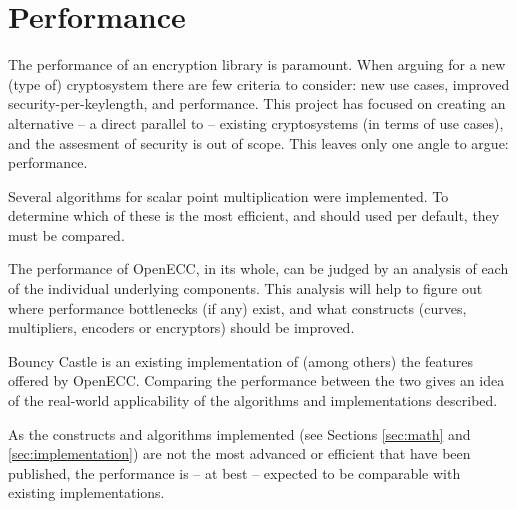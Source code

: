 \section{Performance}
\label{sec:performance}

The performance of an encryption library is paramount. When arguing for a new (type of) cryptosystem there are few
criteria to consider: new use cases, improved security-per-keylength, and performance. This project has focused on
creating an alternative -- a direct parallel to -- existing cryptosystems (in terms of use cases), and the assesment
of security is out of scope. This leaves only one angle to argue: performance.

Several algorithms for scalar point multiplication were implemented. To determine which of these is the most efficient,
and should used per default, they must be compared.
 
The performance of OpenECC, in its whole, can be judged by an analysis of each of the
individual underlying components. This analysis will help to figure out where performance bottlenecks (if
any) exist, and what constructs (curves, multipliers, encoders or encryptors) should be improved.
 
Bouncy Castle is an existing implementation of (among others) the features offered by OpenECC. Comparing the performance
between the two gives an idea of the real-world applicability of the algorithms and implementations described.

As the constructs and algorithms implemented (see Sections \ref{sec:math} and \ref{sec:implementation}) are not the most
advanced or efficient that have been published, the performance is -- at best -- expected to be comparable with existing
implementations.



